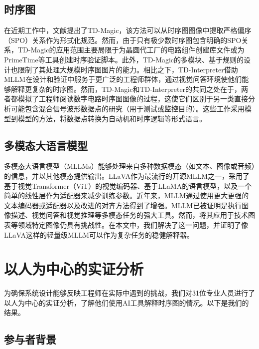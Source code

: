 \subsection{时序图}

在近期工作中，文献提出了TD-Magic，该方法可以从时序图图像中提取严格偏序（SPO）关系作为形式化规范。然而，由于只有极少数时序图包含明确的SPO关系，TD-Magic的应用范围主要局限于为晶圆代工厂的电路组件创建库文件或为PrimeTime等工具创建时序验证脚本。此外，TD-Magic的多模块、基于规则的设计也限制了其处理大规模时序图图片的能力。相比之下，TD-Interpreter借助MLLM在设计和验证中服务于更广泛的工程师群体，通过视觉问答环境使他们能够解释更复杂的时序图。然而，TD-Magic和TD-Interpreter的共同之处在于，两者都模拟了工程师阅读数字电路时序图图像的过程，这使它们区别于另一类直接分析可能包含混合信号波形数据点的研究（用于测试或监控目的）。这些工作采用模型到模型的方法，将数据点转换为自动机和时序逻辑等形式语言。

\subsection{多模态大语言模型}

多模态大语言模型（MLLMs）能够处理来自多种数据模态（如文本、图像或音频）的信息，并以其他模态提供输出。LLaVA作为最流行的开源MLLM之一，采用了基于视觉Transformer（ViT）的视觉编码器、基于LLaMA的语言模型，以及一个简单的线性层作为适配器来减少训练参数。近年来，MLLM通过使用更大更强的文本编码器或适配器以及改进的对齐方法得到了增强。MLLM已被证明是执行图像描述、视觉问答和视觉推理等多模态任务的强大工具。然而，将其应用于技术图表等领域特定图像仍具有挑战性。在本文中，我们解决了这一问题，并证明了像LLaVA这样的轻量级MLLM可以作为复杂任务的稳健解释器。


\section{以人为中心的实证分析}\label{sec:td-empirical}

为确保系统设计能够反映工程师在实际中遇到的挑战，我们对31位专业人员进行了以人为中心的实证分析，了解他们使用AI工具解释时序图的情况。以下是我们的结果。

\subsection{参与者背景}

